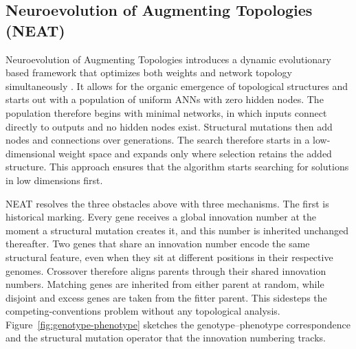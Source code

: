 \documentclass[12pt]{article}
\begin{document}
\subsection{Neuroevolution of Augmenting Topologies (NEAT)}
\label{subsec:neuroevolution-of-augmenting-topologies-neat}


Neuroevolution of Augmenting Topologies introduces a dynamic evolutionary based framework that optimizes both weights and network topology simultaneously \parencite{stanley_evolving_2002}.
It allows for the organic emergence of topological structures and starts out with a population of uniform ANNs with zero hidden nodes.
The population therefore begins with minimal networks, in which inputs connect directly to outputs and no hidden nodes exist.
Structural mutations then add nodes and connections over generations. The search therefore starts in a low-dimensional weight space and expands only where selection retains the added structure.
This approach ensures that the algorithm starts searching for solutions in low dimensions first.

NEAT resolves the three obstacles above with three mechanisms.
The first is historical marking.
Every gene receives a global innovation number at the moment a structural mutation creates it, and this number is inherited unchanged thereafter.
Two genes that share an innovation number encode the same structural feature, even when they sit at different positions in their respective genomes.
Crossover therefore aligns parents through their shared innovation numbers.
Matching genes are inherited from either parent at random, while disjoint and excess genes are taken from the fitter parent.
This sidesteps the competing-conventions problem without any topological analysis.
Figure~\ref{fig:genotype-phenotype} sketches the genotype--phenotype correspondence and the structural mutation operator that the innovation numbering tracks.
\end{document}
